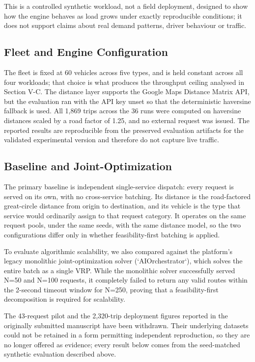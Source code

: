 \documentclass[conference]{IEEEtran}
\begin{document}
This is a controlled synthetic workload, not a field deployment, designed to show how the engine behaves as load grows under exactly reproducible conditions; it does not support claims about real demand patterns, driver behaviour or traffic.

\subsection{Fleet and Engine Configuration}
The fleet is fixed at 60 vehicles across five types, and is held constant across all four workloads; that choice is what produces the throughput ceiling analysed in Section V-C. The distance layer supports the Google Maps Distance Matrix API, but the evaluation ran with the API key unset so that the deterministic haversine fallback is used. All 1,869 trips across the 36 runs were computed on haversine distances scaled by a road factor of 1.25, and no external request was issued. The reported results are reproducible from the preserved evaluation artifacts for the validated experimental version and therefore do not capture live traffic.

\subsection{Baseline and Joint-Optimization}
The primary baseline is independent single-service dispatch: every request is served on its own, with no cross-service batching. Its distance is the road-factored great-circle distance from origin to destination, and its vehicle is the type that service would ordinarily assign to that request category. It operates on the same request pools, under the same seeds, with the same distance model, so the two configurations differ only in whether feasibility-first batching is applied. 

To evaluate algorithmic scalability, we also compared against the platform's legacy monolithic joint-optimization solver (`AIOrchestrator`), which solves the entire batch as a single VRP. While the monolithic solver successfully served N=50 and N=100 requests, it completely failed to return any valid routes within the 2-second timeout window for N=250, proving that a feasibility-first decomposition is required for scalability.

The 43-request pilot and the 2,320-trip deployment figures reported in the originally submitted manuscript have been withdrawn. Their underlying datasets could not be retained in a form permitting independent reproduction, so they are no longer offered as evidence; every result below comes from the seed-matched synthetic evaluation described above.
\end{document}

